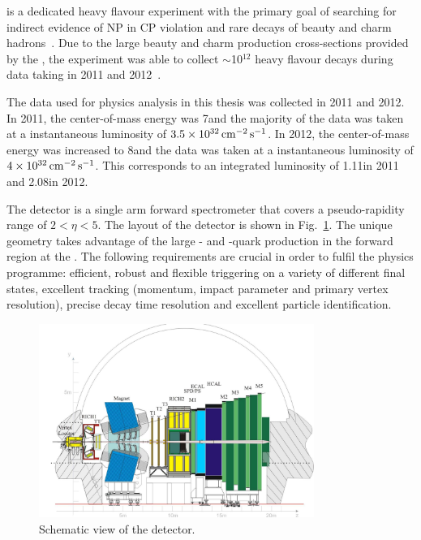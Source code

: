 \lhcb is a dedicated heavy flavour experiment with the primary goal of searching for indirect evidence of NP in CP violation and rare decays of beauty and charm hadrons~\cite{lhcb}. Due to the large beauty and charm production cross-sections provided by the \lhc, the \lhcb experiment was able to collect $\sim$10$^{12}$ heavy flavour decays during data taking in 2011 and 2012~\cite{lhcb-perf}.

The data used for physics analysis in this thesis was collected in 2011 and 2012. In 2011, the center-of-mass energy was 7\tev and the majority of the data was taken at a instantaneous luminosity of $3.5\times10^{32}\mathrm{ \,cm}^{-2}\mathrm{{\,s}}^{-1}$. In 2012, the center-of-mass energy was increased to 8\tev and the data was taken at a instantaneous luminosity of $4\times10^{32}\mathrm{ \,cm}^{-2}\mathrm{{\,s}}^{-1}$. This corresponds to an integrated luminosity of 1.11\invfb in 2011 and 2.08\invfb in 2012.

The \lhcb detector is a single arm forward spectrometer that covers a pseudo-rapidity range of $2 < \eta < 5$. The layout of the \lhcb detector is shown in Fig.~\ref{fig:lhcb-run1}. The unique geometry takes advantage of the large \bquark- and \cquark-quark production in the forward region at the \lhc. The following requirements are crucial in order to fulfil the \lhcb physics programme: efficient, robust and flexible triggering on a variety of different final states, excellent tracking (momentum, impact parameter and primary vertex resolution), precise decay time resolution and excellent particle identification.

\begin{figure}[!htb]
\centering
\includegraphics[width=0.8\textwidth]{figs/detector/lhcb-run1.pdf}
\caption{Schematic view of the \lhcb detector.}
\label{fig:lhcb-run1}
\end{figure}

